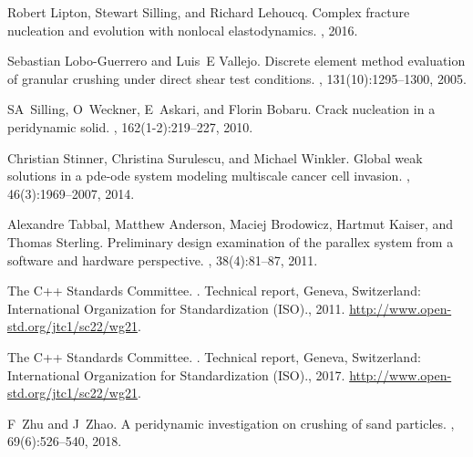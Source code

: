 \documentclass[11pt,twocolumn]{amsart}
\theoremstyle{definition}
\theoremstyle{definition}
\numberwithin{equation}{section}
\numberwithin{equation}{section}
\begin{document}
\begin{thebibliography}{10}
	Robert Lipton, Stewart Silling, and Richard Lehoucq.
	\newblock Complex fracture nucleation and evolution with nonlocal
	elastodynamics.
	, 2016.
	
	Sebastian Lobo-Guerrero and Luis~E Vallejo.
	\newblock Discrete element method evaluation of granular crushing under direct
	shear test conditions.
	,
	131(10):1295--1300, 2005.
	
	SA~Silling, O~Weckner, E~Askari, and Florin Bobaru.
	\newblock Crack nucleation in a peridynamic solid.
	, 162(1-2):219--227, 2010.
	
	Christian Stinner, Christina Surulescu, and Michael Winkler.
	\newblock Global weak solutions in a pde-ode system modeling multiscale cancer
	cell invasion.
	, 46(3):1969--2007, 2014.
	
	Alexandre Tabbal, Matthew Anderson, Maciej Brodowicz, Hartmut Kaiser, and
	Thomas Sterling.
	\newblock Preliminary design examination of the parallex system from a software
	and hardware perspective.
	, 38(4):81--87,
	2011.
	
	{The C++ Standards Committee}.
	.
	\newblock Technical report, {Geneva, Switzerland: International Organization
		for Standardization (ISO).}, 2011.
	\newblock \url{http://www.open-std.org/jtc1/sc22/wg21}.
	
	{The C++ Standards Committee}.
	.
	\newblock Technical report, {Geneva, Switzerland: International Organization
		for Standardization (ISO).}, 2017.
	\newblock \url{http://www.open-std.org/jtc1/sc22/wg21}.
	
	F~Zhu and J~Zhao.
	\newblock A peridynamic investigation on crushing of sand particles.
	, 69(6):526--540, 2018.
	
\end{thebibliography}

\newpage
\end{document}
